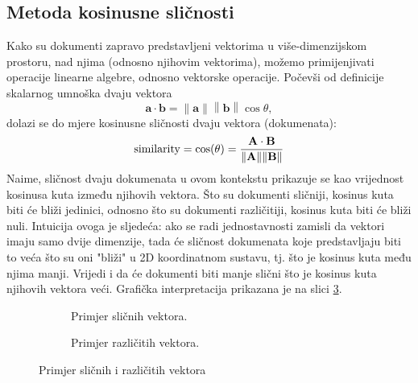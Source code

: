 \documentclass[times, utf8, zavrsni, numeric]{fer}
\begin{document}
\subsection{Metoda kosinusne sličnosti}
Kako su dokumenti zapravo predstavljeni vektorima u više-dimenzijskom prostoru, nad njima (odnosno njihovim vektorima), možemo primijenjivati operacije linearne algebre, odnosno vektorske operacije. Počevši od definicije skalarnog umnoška dvaju vektora
\begin{equation}
\mathbf {a} \cdot \mathbf {b} =\left\|\mathbf {a} \right\|\left\|\mathbf {b} \right\|\cos \theta,
\end{equation}
dolazi se do mjere kosinusne sličnosti dvaju vektora (dokumenata):
\begin{equation}
{\text{similarity}}=\cos(\theta )={\mathbf {A} \cdot \mathbf {B}  \over \|\mathbf {A} \|\|\mathbf {B}\|}
\end{equation}
Naime, sličnost dvaju dokumenata u ovom kontekstu prikazuje se kao vrijednost kosinusa kuta između njihovih vektora. Što su dokumenti sličniji, kosinus kuta biti će bliži jedinici, odnosno što su dokumenti različitiji, kosinus kuta biti će bliži nuli. Intuicija ovoga je sljedeća: ako se radi jednostavnosti zamisli da vektori imaju samo dvije dimenzije, tada će sličnost dokumenata koje predstavljaju biti to veća što su oni "bliži" u 2D koordinatnom sustavu, tj. što je kosinus kuta među njima manji. Vrijedi i da će dokumenti biti manje slični što je kosinus kuta njihovih vektora veći. Grafička interpretacija prikazana je na slici \ref{img:vectors}.

\begin{figure}[!tbp]
\begin{subfigure}[b]{0.4\textwidth}
    
    \caption{Primjer sličnih vektora.}
    \label{fig:f1}
\end{subfigure}
\hfill
\begin{subfigure}[b]{0.4\textwidth}
    
    \caption{Primjer različitih vektora.}
    \label{fig:f2}
\end{subfigure}
\caption{Primjer sličnih i različitih vektora}
\label{img:vectors}
\end{figure}
\end{document}

